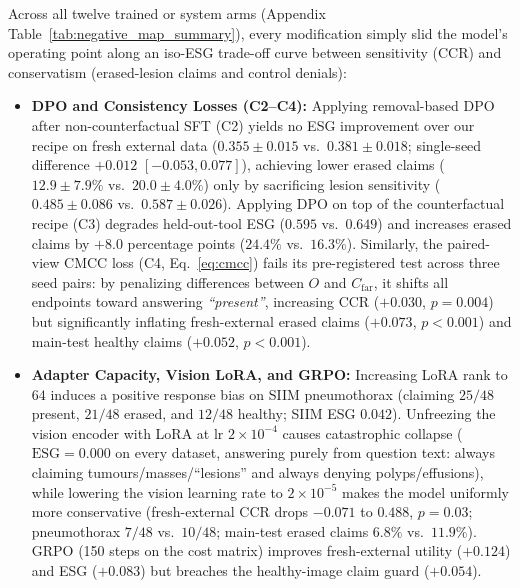 \documentclass{article} %
\begin{document}
Across all twelve trained or system arms (Appendix Table~\ref{tab:negative_map_summary}), every modification simply slid the model's operating point along an iso-ESG trade-off curve between sensitivity (CCR) and conservatism (erased-lesion claims and control denials):
\begin{itemize}[leftmargin=*,nosep]
    \item \textbf{DPO and Consistency Losses (C2--C4):} Applying removal-based DPO after non-counterfactual SFT (C2) yields no ESG improvement over our recipe on fresh external data ($0.355 \pm 0.015$ vs.\ $0.381 \pm 0.018$; single-seed difference $+0.012$ $[-0.053, 0.077]$), achieving lower erased claims ($12.9 \pm 7.9\%$ vs.\ $20.0 \pm 4.0\%$) only by sacrificing lesion sensitivity ($0.485 \pm 0.086$ vs.\ $0.587 \pm 0.026$). Applying DPO on top of the counterfactual recipe (C3) degrades held-out-tool ESG ($0.595$ vs.\ $0.649$) and increases erased claims by $+8.0$ percentage points ($24.4\%$ vs.\ $16.3\%$). Similarly, the paired-view CMCC loss (C4, Eq.~\ref{eq:cmcc}) fails its pre-registered test across three seed pairs: by penalizing differences between $O$ and $C_{\text{far}}$, it shifts all endpoints toward answering \emph{``present''}, increasing CCR ($+0.030$, $p=0.004$) but significantly inflating fresh-external erased claims ($+0.073$, $p<0.001$) and main-test healthy claims ($+0.052$, $p<0.001$).
    \item \textbf{Adapter Capacity, Vision LoRA, and GRPO:} Increasing LoRA rank to $64$ induces a positive response bias on SIIM pneumothorax (claiming $25/48$ present, $21/48$ erased, and $12/48$ healthy; SIIM ESG $0.042$). Unfreezing the vision encoder with LoRA at $\text{lr } 2\times 10^{-4}$ causes catastrophic collapse ($\text{ESG} = 0.000$ on every dataset, answering purely from question text: always claiming tumours/masses/``lesions'' and always denying polyps/effusions), while lowering the vision learning rate to $2\times 10^{-5}$ makes the model uniformly more conservative (fresh-external CCR drops $-0.071$ to $0.488$, $p=0.03$; pneumothorax $7/48$ vs.\ $10/48$; main-test erased claims $6.8\%$ vs.\ $11.9\%$). GRPO (150 steps on the cost matrix) improves fresh-external utility ($+0.124$) and ESG ($+0.083$) but breaches the healthy-image claim guard ($+0.054$).

\end{itemize}
\end{document}
